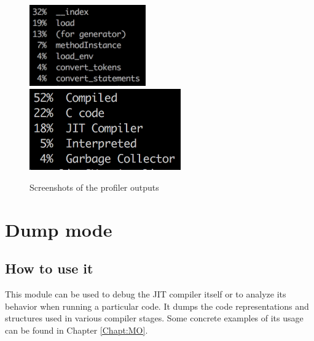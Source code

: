 \begin{figure}[H]
    \centering
    \includegraphics[height=3.5cm]{luajit/images/chapter4/profiler-1.png}
    \includegraphics[height=3.5cm]{luajit/images/chapter4/profiler-2.png}
    \caption{Screenshots of the profiler outputs}
    \label{fig:profiler}
\end{figure}


\section{Dump mode}
\label{Sec:Dump-mode}


\subsection{How to use it}
\label{Subsec:dump-usage}

This module can be used to debug the JIT compiler itself or to analyze its
behavior when running a particular code. It dumps the
code representations and structures used in various compiler stages. Some
concrete examples of its usage can be found in Chapter \ref{Chapt:MO}.

